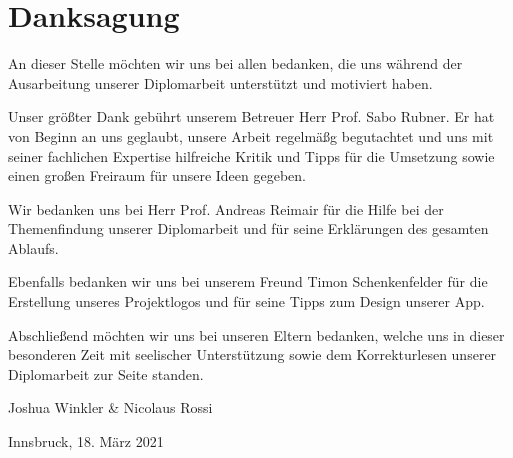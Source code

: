 \section*{Danksagung}

An dieser Stelle möchten wir uns bei allen bedanken, die uns während der Ausarbeitung unserer Diplomarbeit unterstützt und motiviert haben.

Unser größter Dank gebührt unserem Betreuer Herr Prof. Sabo Rubner. Er hat von Beginn an uns geglaubt, unsere Arbeit regelmäßg begutachtet und uns mit seiner fachlichen Expertise hilfreiche Kritik und Tipps für die Umsetzung sowie einen großen Freiraum für unsere Ideen gegeben.

Wir bedanken uns bei Herr Prof. Andreas Reimair für die Hilfe bei der Themenfindung unserer Diplomarbeit und für seine Erklärungen des gesamten Ablaufs.

Ebenfalls bedanken wir uns bei unserem Freund Timon Schenkenfelder für die Erstellung unseres Projektlogos und für seine Tipps zum Design unserer App.

Abschließend möchten wir uns bei unseren Eltern bedanken, welche uns in dieser besonderen Zeit mit seelischer Unterstützung sowie dem Korrekturlesen unserer Diplomarbeit zur Seite standen.

\vspace{1cm}

Joshua Winkler \& Nicolaus Rossi

Innsbruck, 18. März 2021

\newpage